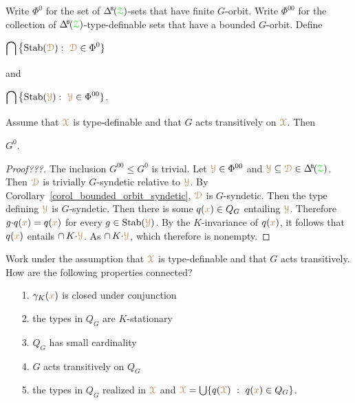 \begin{definition}\label{def_G00}
  Write \emph{$\Phi^0$\/} for the set of $\BDelta(\grZ)$-sets that have finite $G$-orbit.
  Write \emph{$\Phi^{00}$\/} for the collection of $\BDelta(\grZ)$-type-definable sets that have a bounded $G$-orbit.
  Define\smallskip

  \medrel{=}$\displaystyle\bigcap\big\{{\rm Stab}({\color{brown}\EuScript D}) :\  {\color{brown}\EuScript D}\in\Phi^0\}$

  and

  \medrel{=}$\displaystyle\bigcap\big\{{\rm Stab}({\color{brown}\EuScript Y}) :\  {\color{brown}\EuScript Y}\in\Phi^{00}\}$.
\end{definition}

\begin{proposition}
  Assume that ${\color{brown}\EuScript X}$ is type-definable and that $G$ acts transitively on ${\color{brown}\EuScript X}$.
  Then 
  
  \medrel{\leq}$G^0$.
\end{proposition}

\begin{proof}[Proof???]
  The inclusion $G^{00}\leq G^0$ is trivial.
  Let ${\color{brown}\EuScript Y}\in\Phi^{00}$ and $\mrY\subseteq\mrD\in\BDelta(\grZ)$.
  Then ${\color{brown}\EuScript D}$ is trivially $G$-syndetic relative to ${\color{brown}\EuScript Y}$.
  By Corollary~\ref{corol_bounded_orbit_syndetic}, ${\color{brown}\EuScript D}$ is $G$-syndetic.
  Then the type defining ${\color{brown}\EuScript Y}$ is $G$-syndetic.
  Then there is some $q({\color{brown} x})\in Q_G$ entailing ${\color{brown}\EuScript Y}$.
  Therefore $g{\cdot}q({\color{brown} x})=q({\color{brown} x})$ for every $g\in{\rm Stab}({\color{brown}\EuScript Y})$.
  By the $K$-invariance of $q({\color{brown} x})$, it follows that $q({\color{brown} x})$ entails $\cap\,K{\cdot}{\color{brown}\EuScript Y}$.
  As $\cap\,K{\cdot}{\color{brown}\EuScript Y}$, which therefore is nonempty.
\end{proof}


\begin{question}
  Work under the assumption that ${\color{brown}\EuScript X}$ is type-definable and that $G$ acts transitively.
  How are the following properties connected?
  \begin{itemize}
    \item [1.] $\gamma_K({\color{brown} x})$ is closed under conjunction
    \item [2.] the types in $Q_G$ are $K$-stationary
    \item [3.] $Q_G$ has small cardinality
    \item [4.] $G$ acts transitively on $Q_G$
    \item [5.] the types in $Q_G$ realized in ${\color{brown}\EuScript X}$ and ${\color{brown}\EuScript X}=\bigcup\{q({\color{brown}\EuScript X})\ :\ q({\color{brown} x})\in Q_G\}$.
  \end{itemize}
\end{question}

